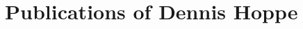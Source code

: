 \documentclass[12pt,a4paper]{article}
\begin{document}
\section*{Publications of Dennis Hoppe}

\nocite{hoppe:2012c}
\nocite{hoppe:2012b}
\nocite{hoppe:2012a}
\nocite{hoppe:2011b}
\nocite{hoppe:2011a}
\nocite{hoppe:2010a}
\nocite{hoppe:2008a}


{\footnotesize
    
}



\end{document}

